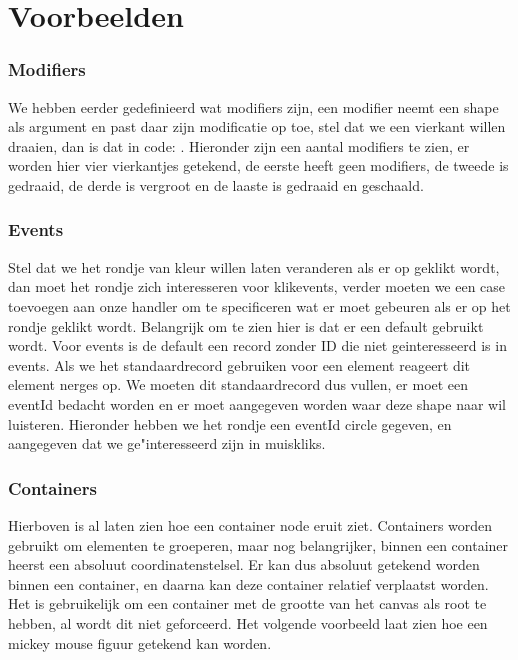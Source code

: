 \section{Voorbeelden}
\subsubsection{Modifiers}
We hebben eerder gedefinieerd wat modifiers zijn, een modifier neemt een shape als argument en past daar zijn modificatie op toe, stel dat we een vierkant willen draaien, dan is dat in code: . Hieronder zijn een aantal modifiers te zien, er worden hier vier vierkantjes getekend, de eerste heeft geen modifiers, de tweede is gedraaid, de derde is vergroot en de laaste is gedraaid en geschaald.



\subsubsection{Events}
Stel dat we het rondje van kleur willen laten veranderen als er op geklikt wordt, dan moet het rondje zich interesseren voor klikevents, verder moeten we een case toevoegen aan onze handler om te specificeren wat er moet gebeuren als er op het rondje geklikt wordt. Belangrijk om te zien hier is dat er een default gebruikt wordt. Voor events is de default een record zonder ID die niet geinteresseerd is in events. Als we het standaardrecord gebruiken voor een element reageert dit element nerges op. We moeten dit standaardrecord dus vullen, er moet een eventId bedacht worden en er moet aangegeven worden waar deze shape naar wil luisteren. Hieronder hebben we het rondje een eventId circle gegeven, en aangegeven dat we ge"interesseerd zijn in muiskliks.



\subsubsection{Containers}
Hierboven is al laten zien hoe een container node eruit ziet. Containers worden gebruikt om elementen te groeperen, maar nog belangrijker, binnen een container heerst een absoluut coordinatenstelsel. Er kan dus absoluut getekend worden binnen een container, en daarna kan deze container relatief verplaatst worden. Het is gebruikelijk om een container met de grootte van het canvas als root te hebben, al wordt dit niet geforceerd. Het volgende voorbeeld laat zien hoe een mickey mouse figuur getekend kan worden.

